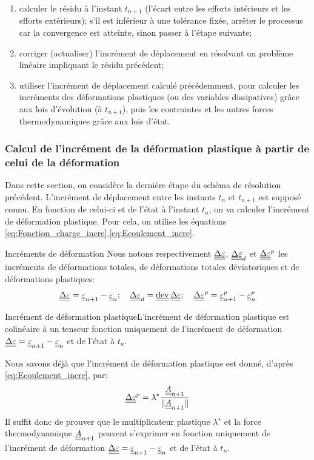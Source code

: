 \documentclass[10pt]{book}
\newcommand{\FthEpsp}{\ten{A}}
\begin{document}
\begin{appendices}
\begin{enumerate}
\item calculer le résidu à l'instant $t_{n+1}$ (l'écart entre les efforts intérieurs et les efforts extérieurs); s'il est inférieur à une tolérance fixée, arrêter le processus car la convergence est atteinte, sinon passer à l'étape suivante;
\item corriger (actualiser) l'incrément de déplacement en résolvant un problème linéaire impliquant le résidu précédent;
\item utiliser l'incrément de déplacement calculé précédemment, pour calculer les incréments des déformations plastiques (ou des variables dissipatives) grâce aux lois d'évolution (à $t_{n+1}$), puis les contraintes et les autres forces thermodynamiques grâce aux lois d'état.
\end{enumerate}
\subsubsection{Calcul de l'incrément de la déformation plastique à partir de celui de la déformation}
Dans cette section, on considère la dernière étape du schéma de résolution précédent. L'incrément de déplacement entre les instants $t_{n}$ et $t_{n+1}$ est supposé connu. En fonction de celui-ci et de l'état à l'instant $t_{n}$, on va calculer l'incrément de déformation plastique. Pour cela, on utilise les équations \eqref{eq:Fonction_charge_incre},\eqref{eq:Ecoulement_incre}.\\
\begin{Not}{Incréments de déformation} Nous notons respectivement $\underline{\underline{\Delta}}\underline{\underline{\varepsilon}}$, $\underline{\underline{\Delta}}\underline{\underline{\varepsilon}}_{d}$ et $\underline{\underline{\Delta}}\underline{\underline{\varepsilon}}^{p}$ les incréments de déformations totales, de déformations totales déviatoriques et de déformations plastiques:
$$\DeltaDefoHPP = \DefoHPP_{n+1}-\DefoHPP_{n}; \quad \DeltaDefoHPP_{d}=\dev\DeltaDefoHPP; \quad \DeltaEpsP=\EpsP_{n+1}-\EpsP_{n}$$
\end{Not}
\begin{Theo}{Incrément de déformation plastique}L'incrément de déformation plastique est colinéaire à un tenseur fonction uniquement de l'incrément de déformation $\underline{\underline{\Delta}}\underline{\underline{\varepsilon}}=\underline{\underline{\varepsilon}}_{n+1}-\underline{\underline{\varepsilon}}_{n}$ et de l'état à $t_{n}.$ 
\end{Theo}
\begin{Demo}{Nous savons déjà que l'incrément de déformation plastique est donné, d'après \eqref{eq:Ecoulement_incre}, par:
$$\DeltaEpsP=\lambda^{\star}\frac{\FthEpsp_{n+1}}{\Vert \FthEpsp_{n+1}\Vert}$$
Il suffit donc de prouver que le multiplicateur plastique $\lambda^{\star}$ et la force thermodynamique $\FthEpsp_{n+1}$ peuvent s’exprimer en fonction uniquement de l'incrément de déformation $\underline{\underline{\Delta}}\underline{\underline{\varepsilon}}=\underline{\underline{\varepsilon}}_{n+1}-\underline{\underline{\varepsilon}}_{n}$ et de l'état à $t_{n}$.\\

}
\end{Demo}
\end{appendices}
\end{document}
